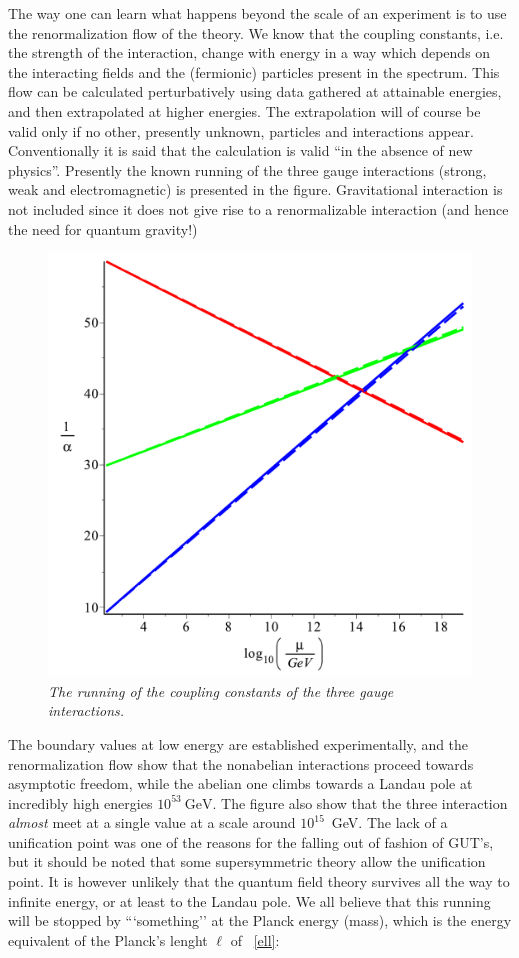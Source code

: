 \documentclass[12pt,a4paper]{article}
\newcommand{\formu}[1]{$  #1$}
\begin{document}
The way one can learn what happens beyond the scale of an experiment is to use the renormalization flow of the theory. We know that the coupling constants, i.e. the strength of the interaction, change with energy in a way which depends on the interacting fields and the (fermionic) particles present in the spectrum. This flow can be calculated perturbatively using data gathered at attainable energies, and then extrapolated at higher energies. The extrapolation will of course be valid only if no other, presently unknown, particles and interactions appear. Conventionally it is said that the calculation is valid ``in the absence of new physics''. Presently the known running of the three gauge interactions (strong, weak and electromagnetic) is presented in the figure. Gravitational interaction is not included since it does not give rise to a renormalizable interaction (and hence the need for quantum gravity!)
\begin{figure}[htbp]
\begin{center}
\includegraphics[scale=.45]{gaugerun.pdf}
\end{center}
\caption{\sl The running of the coupling constants of the three gauge interactions.}
\end{figure}
The boundary values at low energy are established experimentally, and the renormalization flow show that the nonabelian interactions proceed towards asymptotic freedom, while the abelian one climbs towards a Landau pole at incredibly high energies \formu{10^{53}~\mathrm{GeV}}. The figure also show that the three interaction \emph{almost} meet at a single value at a scale around $10^{15}$~GeV. The lack of a unification point was one of the reasons for the falling out of fashion of GUT's, but it should be noted that some supersymmetric theory allow the unification point. It is however unlikely that the quantum field theory survives all the way to infinite energy, or at least to the Landau pole. We all believe that this running will be stopped by {```something''} at the Planck energy (mass), which is the energy equivalent of the Planck's lenght $\ell$ of ~\eqref{ell}:
\end{document}
